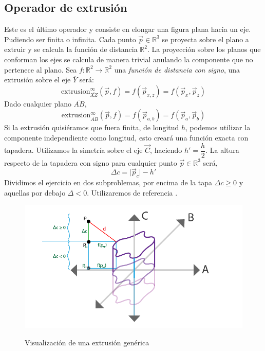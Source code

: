 \subsection{Operador de extrusión}
Este es el último operador y consiste en elongar una figura plana hacia un eje. Pudiendo ser finita o infinita. Cada punto \(\Vec{p}\in\mathbb{R}^3\) se proyecta sobre el plano a extruir y se calcula la función de distancia \(\mathbb{R}^2\). La proyección sobre los planos que conforman los ejes se calcula de manera trivial anulando la componente que no pertenece al plano. Sea \(f:\mathbb{R}^2\longrightarrow\mathbb{R}^2\) una \textit{función de distancia con signo}, una extrusión sobre el eje \(\overline{Y}\) será:
\[\text{extrusion}^\infty_{\overline{XZ}}\left(\Vec{p},f\right) = f\left(\Vec{p}_{x,z}\right)=f\left(\Vec{p}_{x}, \Vec{p}_{z}\right)\]
Dado cualquier plano \(\overline{AB}\),
\[\text{extrusion}^\infty_{\overline{AB}}\left(\Vec{p},f\right) = f\left(\Vec{p}_{a,b}\right)=f\left(\Vec{p}_{a}, \Vec{p}_{b}\right)\]
Si la extrusión quisiéramos que fuera finita, de longitud \(h\), podemos utilizar la componente independiente como longitud, esto creará una función exacta con tapadera. Utilizamos la simetría sobre el eje \(\Vec{C}\), haciendo \(h'=\dfrac{h}{2}\). La altura respecto de la tapadera con signo para cualquier punto \(\Vec{p} \in\mathbb{R}^3\) será,
\[\Delta c  =\vert\Vec{p}_c\vert - h'\]
Dividimos el ejercicio en dos subproblemas, por encima de la tapa \(\Delta c \ge 0\) y aquellas por debajo \(\Delta < 0\). Utilizaremos de referencia .

\begin{figure}[H]
  \centering
  \captionsetup{justification=centering}%
  \includegraphics[width=1.0\textwidth]{secciones/imagenes/sdf/proofs/proof_extrussion.png}\label{fig:capsula}
  \caption{Visualización de una extrusión genérica}
\end{figure}

